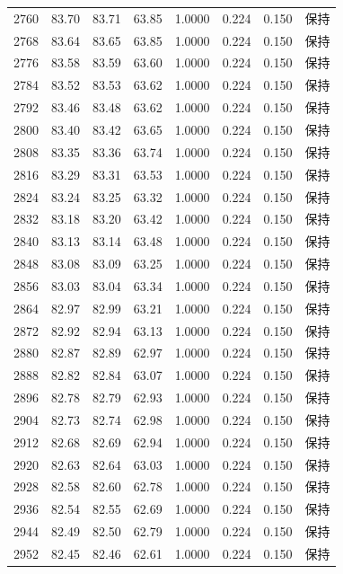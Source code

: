 \begin{longtable}{rrrrrrrr}
2760 & 83.70 & 83.71 & 63.85 & 1.0000 & 0.224 & 0.150 & 保持 \\
2768 & 83.64 & 83.65 & 63.85 & 1.0000 & 0.224 & 0.150 & 保持 \\
2776 & 83.58 & 83.59 & 63.60 & 1.0000 & 0.224 & 0.150 & 保持 \\
2784 & 83.52 & 83.53 & 63.62 & 1.0000 & 0.224 & 0.150 & 保持 \\
2792 & 83.46 & 83.48 & 63.62 & 1.0000 & 0.224 & 0.150 & 保持 \\
2800 & 83.40 & 83.42 & 63.65 & 1.0000 & 0.224 & 0.150 & 保持 \\
2808 & 83.35 & 83.36 & 63.74 & 1.0000 & 0.224 & 0.150 & 保持 \\
2816 & 83.29 & 83.31 & 63.53 & 1.0000 & 0.224 & 0.150 & 保持 \\
2824 & 83.24 & 83.25 & 63.32 & 1.0000 & 0.224 & 0.150 & 保持 \\
2832 & 83.18 & 83.20 & 63.42 & 1.0000 & 0.224 & 0.150 & 保持 \\
2840 & 83.13 & 83.14 & 63.48 & 1.0000 & 0.224 & 0.150 & 保持 \\
2848 & 83.08 & 83.09 & 63.25 & 1.0000 & 0.224 & 0.150 & 保持 \\
2856 & 83.03 & 83.04 & 63.34 & 1.0000 & 0.224 & 0.150 & 保持 \\
2864 & 82.97 & 82.99 & 63.21 & 1.0000 & 0.224 & 0.150 & 保持 \\
2872 & 82.92 & 82.94 & 63.13 & 1.0000 & 0.224 & 0.150 & 保持 \\
2880 & 82.87 & 82.89 & 62.97 & 1.0000 & 0.224 & 0.150 & 保持 \\
2888 & 82.82 & 82.84 & 63.07 & 1.0000 & 0.224 & 0.150 & 保持 \\
2896 & 82.78 & 82.79 & 62.93 & 1.0000 & 0.224 & 0.150 & 保持 \\
2904 & 82.73 & 82.74 & 62.98 & 1.0000 & 0.224 & 0.150 & 保持 \\
2912 & 82.68 & 82.69 & 62.94 & 1.0000 & 0.224 & 0.150 & 保持 \\
2920 & 82.63 & 82.64 & 63.03 & 1.0000 & 0.224 & 0.150 & 保持 \\
2928 & 82.58 & 82.60 & 62.78 & 1.0000 & 0.224 & 0.150 & 保持 \\
2936 & 82.54 & 82.55 & 62.69 & 1.0000 & 0.224 & 0.150 & 保持 \\
2944 & 82.49 & 82.50 & 62.79 & 1.0000 & 0.224 & 0.150 & 保持 \\
2952 & 82.45 & 82.46 & 62.61 & 1.0000 & 0.224 & 0.150 & 保持 \\

\end{longtable}
